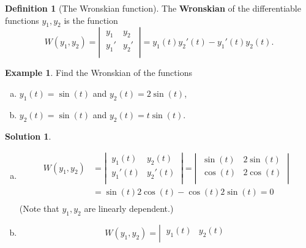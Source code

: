 \documentclass{article}
\theoremstyle{plain}
\theoremstyle{definition}
\newtheorem{definition}[thm]{Definition}
\newtheorem{exmp}{Example}[section]
\newtheorem*{sol}{Solution}
\numberwithin{equation}{section}
\begin{document}
\bigskip
\begin{definition}[The Wronskian function]
    The \textbf{Wronskian} of the differentiable functions $y_1,y_2$ is the function
    \[
        W(y_1,y_2) = \left\vert\ \begin{matrix}
            y_1 & y_2\\
            y_1' & y_2'\\
        \end{matrix}\ \right\vert
        = y_1(t)y_2'(t) - y_1'(t)y_2(t).
    \]
\end{definition}

\begin{tcolorbox}
    \begin{exmp}
        Find the Wronskian of the functions
        \begin{enumerate}[(a)]
            \item $y_1(t) = \sin(t)$ and $y_2(t) = 2\sin(t)$,
            \item $y_2(t) = \sin(t)$ and $y_2(t) = t\sin(t)$.
        \end{enumerate}
    \end{exmp}
    \begin{sol}
        \begin{enumerate}[(a)]\hfill
            \item 
            \[
            \begin{aligned}
                W(y_1, y_2) &= \left\vert\ \begin{matrix}
                    y_1(t) & y_2(t)\\
                    y_1'(t) & y_2'(t)\\
                    \end{matrix}\ \right\vert
                = \left\vert\ \begin{matrix}
                    \sin(t) & 2\sin(t)\\
                    \cos(t)& 2\cos(t)\\
                    \end{matrix}\ \right\vert \\
                &= \sin(t)2\cos(t) - \cos(t)2\sin(t) = 0 \\
            \end{aligned}
            \]
            (Note that $y_1,y_2$ are linearly dependent.)
            \item 
            \[ W(y_1, y_2) = \left\vert\ \begin{matrix}
                    y_1(t) & y_2(t)\\

\end{matrix}\]
\end{enumerate}
\end{sol}
\end{tcolorbox}
\end{document}
